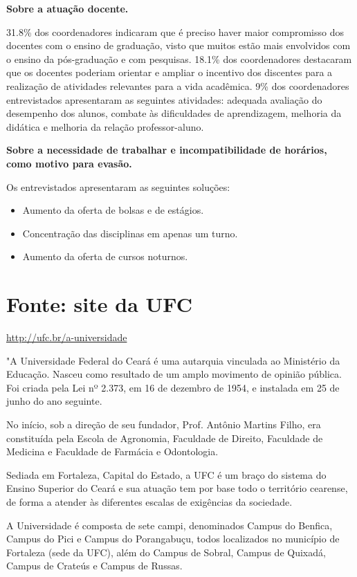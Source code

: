 \documentclass{report}
\begin{document}
\textbf{Sobre a atuação docente.}

31.8\% dos coordenadores indicaram que é preciso haver maior compromisso dos docentes com o ensino de graduação, visto que muitos estão mais envolvidos com o ensino da pós-graduação e com pesquisas. 18.1\% dos coordenadores destacaram que os docentes poderiam orientar e ampliar o incentivo dos discentes para a realização de atividades relevantes para a vida acadêmica. 9\% dos coordenadores entrevistados apresentaram as seguintes atividades: adequada avaliação do desempenho dos alunos, combate às dificuldades de aprendizagem, melhoria da didática e melhoria da relação professor-aluno.

\textbf{Sobre a necessidade de trabalhar e incompatibilidade de horários, como motivo para evasão.}

Os entrevistados apresentaram as seguintes soluções:

\begin{itemize}
\item Aumento da oferta de bolsas e de estágios.
\item Concentração das disciplinas em apenas um turno.
\item Aumento da oferta de cursos noturnos.
\end{itemize}


\section{Fonte: site da UFC}

\url{http://ufc.br/a-universidade}

"A Universidade Federal do Ceará é uma autarquia vinculada ao Ministério da Educação. Nasceu como resultado de um amplo movimento de opinião pública. Foi criada pela Lei nº 2.373, em 16 de dezembro de 1954, e instalada em 25 de junho do ano seguinte.

No início, sob a direção de seu fundador, Prof. Antônio Martins Filho, era constituída pela Escola de Agronomia, Faculdade de Direito, Faculdade de Medicina e Faculdade de Farmácia e Odontologia.

Sediada em Fortaleza, Capital do Estado, a UFC é um braço do sistema do Ensino Superior do Ceará e sua atuação tem por base todo o território cearense, de forma a atender às diferentes escalas de exigências da sociedade.

A Universidade é composta de sete campi, denominados Campus do Benfica, Campus do Pici e Campus do Porangabuçu, todos localizados no município de Fortaleza (sede da UFC), além do Campus de Sobral, Campus de Quixadá, Campus de Crateús e Campus de Russas.
\end{document}
